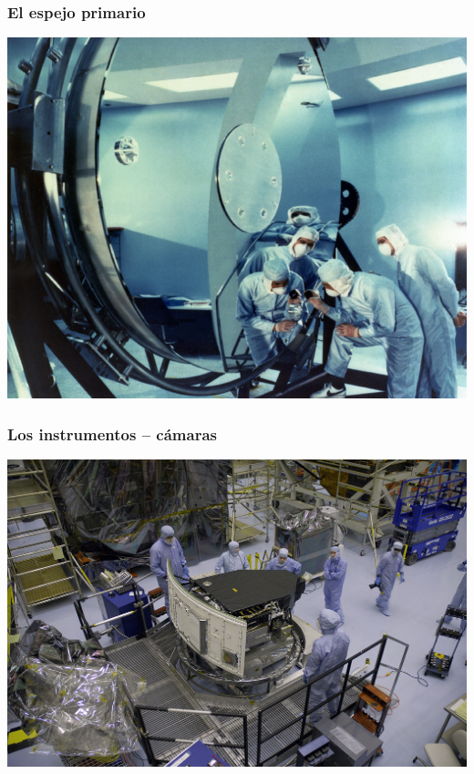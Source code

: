 \documentclass{beamer}
\begin{document}
\begin{frame}
  \frametitle{El espejo primario}
  \includegraphics{hubble_mirror}
\end{frame}

\begin{frame}
  \frametitle{Los instrumentos -- cámaras}
  \includegraphics{1280px-Wide_Field_Camera_3}
\end{frame}
\end{document}
